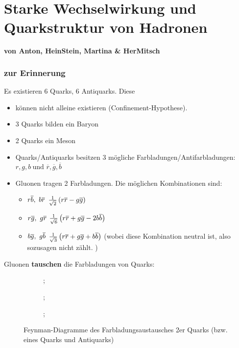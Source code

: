 \documentclass[Ex4_Zusammenfassung.tex]{subfiles}
\begin{document}
\chapter{Starke Wechselwirkung und Quarkstruktur von Hadronen}
\textbf{von Anton, HeinStein, Martina \& HerMitsch}
\subsection{zur Erinnerung}
Es existieren 6 Quarks, 6 Antiquarks. Diese
\begin{itemize}
	\item können nicht alleine existieren (Confinement-Hypothese).
	\item 3 Quarks bilden ein Baryon
	\item 2 Quarks ein Meson
	\item Quarks/Antiquarks besitzen 3 mögliche Farbladungen/Antifarbladungen: $r,g,b\ \text{und } \overline{r}, \overline{g}, \overline{b}$
	\item Gluonen tragen 2 Farbladungen. Die möglichen Kombinationen sind:
		\begin{itemize}
			\item[] $r\overline{b},\ b\overline{r}$ \qquad $\frac{1}{\sqrt{2}}\left(  r\overline{r} - g\overline{g} \right)$
			\item[] $r\overline{g},\ g\overline{r}$ \qquad $\frac{1}{\sqrt{6}}\left(  r\overline{r} + g\overline{g} - 2b\overline{b} \right)$
			\item[] $b\overline{g},\ g\overline{b}$ \qquad $\frac{1}{\sqrt{3}}\left( r\overline{r} + g\overline{g} + b\overline{b}  \right)$ (wobei diese Kombination neutral ist, also sozusagen nicht zählt. )
		\end{itemize}
\end{itemize}
Gluonen \textbf{tauschen} die Farbladungen von Quarks:
\begin{figure}[h]
	\centering
	\begin{subfigure}{0.3\textwidth}
		\centering
			;
	\end{subfigure}
	\quad
	\begin{subfigure}{0.3\textwidth}
		\centering
		;
	\end{subfigure}
	\quad 
	\begin{subfigure}{0.3\textwidth}
		\centering
		;
	\end{subfigure}
	\caption{Feynman-Diagramme des Farbladungsaustausches 2er Quarks (bzw. eines Quarks und Antiquarks)}
\end{figure}
\end{document}
